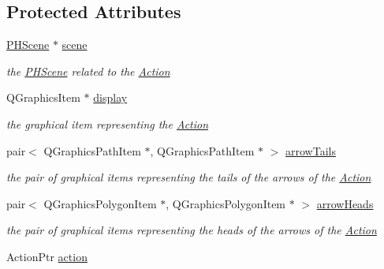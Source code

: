 \subsection*{\-Protected \-Attributes}
\begin{DoxyCompactItemize}
\item 
\hypertarget{class_g_action_a5318deb6935859f5d2ebd1836ec6eb85}{\hyperlink{class_p_h_scene}{\-P\-H\-Scene} $\ast$ \hyperlink{class_g_action_a5318deb6935859f5d2ebd1836ec6eb85}{scene}}\label{class_g_action_a5318deb6935859f5d2ebd1836ec6eb85}

\begin{DoxyCompactList}\small\item\em the \hyperlink{class_p_h_scene}{\-P\-H\-Scene} related to the \hyperlink{class_action}{\-Action} \end{DoxyCompactList}\item 
\hypertarget{class_g_action_a80fd22faf283374dd9861bf4900eafa4}{\-Q\-Graphics\-Item $\ast$ \hyperlink{class_g_action_a80fd22faf283374dd9861bf4900eafa4}{display}}\label{class_g_action_a80fd22faf283374dd9861bf4900eafa4}

\begin{DoxyCompactList}\small\item\em the graphical item representing the \hyperlink{class_action}{\-Action} \end{DoxyCompactList}\item 
\hypertarget{class_g_action_abc626fc7dc52a5f02960706c02a52db9}{pair$<$ \-Q\-Graphics\-Path\-Item \*
$\ast$, \-Q\-Graphics\-Path\-Item $\ast$ $>$ \hyperlink{class_g_action_abc626fc7dc52a5f02960706c02a52db9}{arrow\-Tails}}\label{class_g_action_abc626fc7dc52a5f02960706c02a52db9}

\begin{DoxyCompactList}\small\item\em the pair of graphical items representing the tails of the arrows of the \hyperlink{class_action}{\-Action} \end{DoxyCompactList}\item 
\hypertarget{class_g_action_aab9cc72a8692e0b15f19e192ab21d609}{pair$<$ \-Q\-Graphics\-Polygon\-Item \*
$\ast$, \-Q\-Graphics\-Polygon\-Item $\ast$ $>$ \hyperlink{class_g_action_aab9cc72a8692e0b15f19e192ab21d609}{arrow\-Heads}}\label{class_g_action_aab9cc72a8692e0b15f19e192ab21d609}

\begin{DoxyCompactList}\small\item\em the pair of graphical items representing the heads of the arrows of the \hyperlink{class_action}{\-Action} \end{DoxyCompactList}\item 
\hypertarget{class_g_action_a22f734f6fb2fade298681819341b4f75}{\-Action\-Ptr \hyperlink{class_g_action_a22f734f6fb2fade298681819341b4f75}{action}}\label{class_g_action_a22f734f6fb2fade298681819341b4f75}


\end{DoxyCompactItemize}
